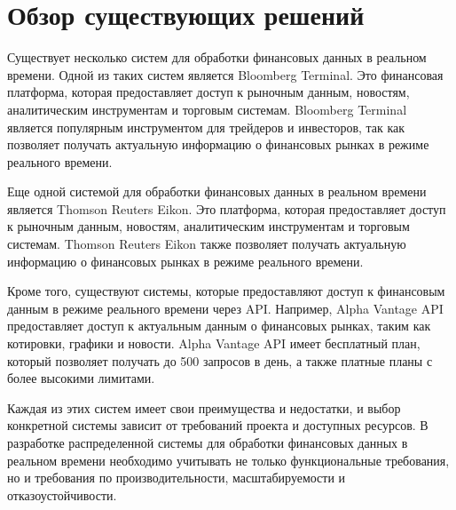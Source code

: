 \section{Обзор существующих решений}

Существует несколько систем для обработки финансовых данных в реальном времени.
Одной из таких систем является Bloomberg Terminal. Это финансовая платформа,
которая предоставляет доступ к рыночным данным, новостям, аналитическим
инструментам и торговым системам. Bloomberg Terminal является популярным
инструментом для трейдеров и инвесторов, так как позволяет получать актуальную
информацию о финансовых рынках в режиме реального времени.

Еще одной системой для обработки финансовых данных в реальном времени является
Thomson Reuters Eikon. Это платформа, которая предоставляет доступ к рыночным
данным, новостям, аналитическим инструментам и торговым системам. Thomson
Reuters Eikon также позволяет получать актуальную информацию о финансовых рынках
в режиме реального времени.

Кроме того, существуют системы, которые предоставляют доступ к финансовым
данным в режиме реального времени через API. Например, Alpha Vantage API
предоставляет доступ к актуальным данным о финансовых рынках, таким как
котировки, графики и новости. Alpha Vantage API имеет бесплатный план, который
позволяет получать до 500 запросов в день, а также платные планы с более
высокими лимитами.

Каждая из этих систем имеет свои преимущества и недостатки, и выбор конкретной
системы зависит от требований проекта и доступных ресурсов. В разработке
распределенной системы для обработки финансовых данных в реальном времени
необходимо учитывать не только функциональные требования, но и требования по
производительности, масштабируемости и отказоустойчивости.